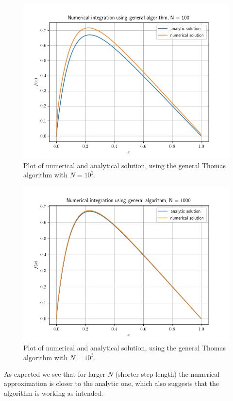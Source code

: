 \documentclass[english,notitlepage,reprint,nofootinbib]{revtex4-1}  %
\begin{document}
\begin{figure}[H]
	\centering
	\label{fig:iv:a:2}
	\includegraphics[width=\columnwidth]{plots/Figure_2.png}
	\caption{Plot of numerical and analytical solution, using the general Thomas algorithm with
	\(N=10^{2}\).}
\end{figure}

\begin{figure}[H]
	\centering
	\label{fig:iv:a:3}
	\includegraphics[width=\columnwidth]{plots/Figure_3.png}
	\caption{Plot of numerical and analytical solution, using the general Thomas algorithm with
	\(N=10^{3}\).}
\end{figure}


As expected we see that for larger $N$ (shorter step length) the numerical approximation is closer to the analytic one, which also suggests that the algorithm is working as intended.
\end{document}
